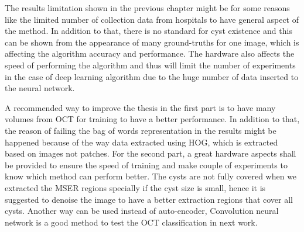 The results limitation shown in the previous chapter might be for some reasons like the limited number of collection data from hospitals to have general aspect of the method.
In addition to that, there is no standard for cyst existence and this can be shown from the appearance of many ground-truths for one image, which is affecting the algorithm accuracy and performance.
The hardware also affects the speed of performing the algorithm and thus will limit the number of experiments in the case of deep learning algorithm due to the huge number of data inserted to the neural network.

A recommended way to improve the thesis in the first part is to have many volumes from OCT for training to have a better performance.
In addition to that, the reason of failing the bag of words representation in the results might be happened because of the way data extracted using HOG, which is extracted based on images not patches.
For the second part, a great hardware aspects shall be provided to ensure the speed of training and make couple of experiments to know which method can perform better.
The cysts are not fully covered when we extracted the MSER regions specially if the cyst size is small, hence it is suggested to denoise the image to have a better extraction regions that cover all cysts. 
Another way can be used instead of auto-encoder, Convolution neural network is a good method to test the OCT classification in next work.